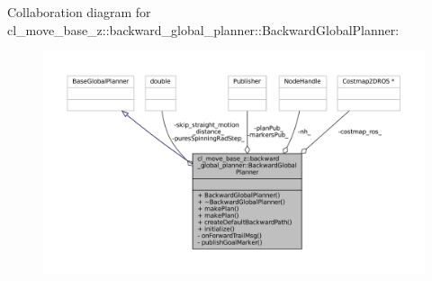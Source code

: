 Collaboration diagram for cl\+\_\+move\+\_\+base\+\_\+z\+:\+:backward\+\_\+global\+\_\+planner\+:\+:Backward\+Global\+Planner\+:
\nopagebreak
\begin{figure}[H]
\begin{center}
\leavevmode
\includegraphics[width=350pt]{classcl__move__base__z_1_1backward__global__planner_1_1BackwardGlobalPlanner__coll__graph}
\end{center}
\end{figure}
